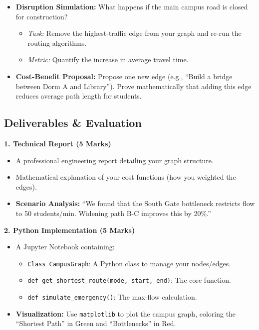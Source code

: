 \documentclass[
  letterpaper,
  DIV=11,
  numbers=noendperiod]{scrreprt}
\providecommand{\tightlist}{%
  \setlength{\itemsep}{0pt}\setlength{\parskip}{0pt}}
\begin{document}
\begin{itemize}
\item
  \textbf{Disruption Simulation:} What happens if the main campus road
  is closed for construction?

  \begin{itemize}
  \tightlist
  \item
    \emph{Task:} Remove the highest-traffic edge from your graph and
    re-run the routing algorithms.
  \item
    \emph{Metric:} Quantify the increase in average travel time.
  \end{itemize}
\item
  \textbf{Cost-Benefit Proposal:} Propose one new edge (e.g., ``Build a
  bridge between Dorm A and Library''). Prove mathematically that adding
  this edge reduces average path length for students.
\end{itemize}

\subsection{Deliverables \& Evaluation}\label{deliverables-evaluation}

\textbf{1. Technical Report (5 Marks)}

\begin{itemize}
\tightlist
\item
  A professional engineering report detailing your graph structure.
\item
  Mathematical explanation of your cost functions (how you weighted the
  edges).
\item
  \textbf{Scenario Analysis:} ``We found that the South Gate bottleneck
  restricts flow to 50 students/min. Widening path B-C improves this by
  20\%.''
\end{itemize}

\textbf{2. Python Implementation (5 Marks)}

\begin{itemize}
\tightlist
\item
  A Jupyter Notebook containing:

  \begin{itemize}
  \tightlist
  \item
    \texttt{Class\ CampusGraph}: A Python class to manage your
    nodes/edges.
  \item
    \texttt{def\ get\_shortest\_route(mode,\ start,\ end)}: The core
    function.
  \item
    \texttt{def\ simulate\_emergency()}: The max-flow calculation.
  \end{itemize}
\item
  \textbf{Visualization:} Use \texttt{matplotlib} to plot the campus
  graph, coloring the ``Shortest Path'' in Green and ``Bottlenecks'' in
  Red.
\end{itemize}
\end{document}
